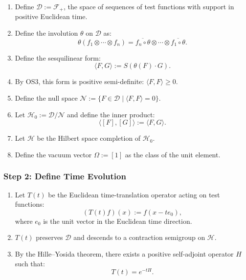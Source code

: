 \documentclass{article}
\begin{document}
\begin{enumerate}
  \item Define $\mathscr{D} := \mathcal{F}_+$, the space of sequences of test functions with support in positive Euclidean time.

  \item Define the involution $\theta$ on $\mathscr{D}$ as:
  \[
  \theta(f_1 \otimes \cdots \otimes f_n) = \overline{f_n \circ \theta} \otimes \cdots \otimes \overline{f_1 \circ \theta}.
  \]

  \item Define the sesquilinear form:
  \[
  \langle F, G \rangle := S(\theta(F) \cdot G).
  \]

  \item By OS3, this form is positive semi-definite: $\langle F, F \rangle \geq 0$.

  \item Define the null space $\mathscr{N} := \{ F \in \mathscr{D} \mid \langle F, F \rangle = 0 \}$.

  \item Let $\mathcal{H}_0 := \mathscr{D} / \mathscr{N}$ and define the inner product:
  \[
  \langle [F], [G] \rangle := \langle F, G \rangle.
  \]

  \item Let $\mathcal{H}$ be the Hilbert space completion of $\mathcal{H}_0$.

  \item Define the vacuum vector $\Omega := [1]$ as the class of the unit element.
\end{enumerate}

\subsubsection*{Step 2: Define Time Evolution}

\begin{enumerate}
  \item Let $T(t)$ be the Euclidean time-translation operator acting on test functions:
  \[
  (T(t) f)(x) := f(x - t e_0),
  \]
  where $e_0$ is the unit vector in the Euclidean time direction.

  \item $T(t)$ preserves $\mathscr{D}$ and descends to a contraction semigroup on $\mathcal{H}$.

  \item By the Hille--Yosida theorem, there exists a positive self-adjoint operator $H$ such that:
  \[
  T(t) = e^{-tH}.
  \]
\end{enumerate}
\end{document}
